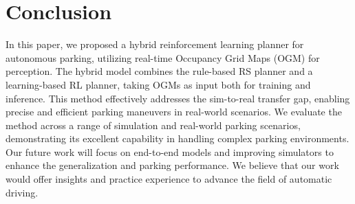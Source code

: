\documentclass[ conference]{./support/ieeeconf}
\begin{document}
\section{Conclusion}
In this paper, we proposed a hybrid reinforcement learning planner for autonomous parking, utilizing real-time Occupancy Grid Maps (OGM) for perception. 
The hybrid model combines the rule-based RS planner and a learning-based RL planner, taking OGMs as input both for training and inference. 
This method effectively addresses the sim-to-real transfer gap, enabling precise and efficient parking maneuvers in real-world scenarios. 
We evaluate the method across a range of simulation and real-world parking scenarios, demonstrating its excellent capability in handling complex parking environments. 
Our future work will focus on end-to-end models and improving simulators to enhance the generalization and parking performance. 
We believe that our work would offer insights and practice experience to advance the field of automatic driving. 








\clearpage


\end{document}
